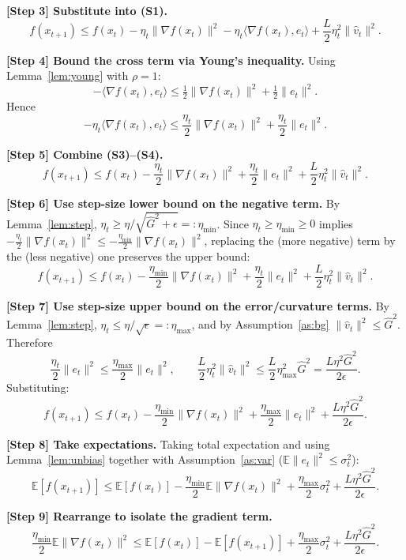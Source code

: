 \documentclass[11pt]{article}
\begin{document}
\noindent\textbf{[Step 3] Substitute into (S1).}
\[
f(x_{t+1}) \le f(x_t) - \eta_t \|\nabla f(x_t)\|^2
- \eta_t \langle \nabla f(x_t), e_t\rangle
+ \frac{L}{2}\eta_t^2 \|\hat v_t\|^2.
\tag{S3}
\]

\noindent\textbf{[Step 4] Bound the cross term via Young's inequality.}
Using Lemma~\ref{lem:young} with $\rho=1$:
\[
-\langle \nabla f(x_t), e_t\rangle
\le \tfrac12 \|\nabla f(x_t)\|^2 + \tfrac12 \|e_t\|^2.
\tag{S4}
\]
Hence
\[
-\eta_t\langle \nabla f(x_t), e_t\rangle
\le \frac{\eta_t}{2}\|\nabla f(x_t)\|^2 + \frac{\eta_t}{2}\|e_t\|^2.
\]

\noindent\textbf{[Step 5] Combine (S3)–(S4).}
\[
f(x_{t+1}) \le f(x_t) - \frac{\eta_t}{2}\|\nabla f(x_t)\|^2
+ \frac{\eta_t}{2}\|e_t\|^2
+ \frac{L}{2}\eta_t^2 \|\hat v_t\|^2.
\tag{S5}
\]

\noindent\textbf{[Step 6] Use step-size lower bound on the negative term.}
By Lemma~\ref{lem:step}, $\eta_t \ge \eta/\sqrt{\hat G^2+\epsilon} =: \eta_{\min}$.
Since $\eta_t \ge \eta_{\min} \ge 0$ implies
$-\tfrac{\eta_t}{2}\|\nabla f(x_t)\|^2 \le -\tfrac{\eta_{\min}}{2}\|\nabla f(x_t)\|^2$,
replacing the (more negative) term by the (less negative) one preserves the upper bound:
\[
f(x_{t+1}) \le f(x_t) - \frac{\eta_{\min}}{2}\|\nabla f(x_t)\|^2
+ \frac{\eta_t}{2}\|e_t\|^2
+ \frac{L}{2}\eta_t^2 \|\hat v_t\|^2.
\tag{S6}
\]

\noindent\textbf{[Step 7] Use step-size upper bound on the error/curvature terms.}
By Lemma~\ref{lem:step}, $\eta_t \le \eta/\sqrt{\epsilon} =: \eta_{\max}$,
and by Assumption~\ref{as:bg} $\|\hat v_t\|^2 \le \hat G^2$. Therefore
\[
\frac{\eta_t}{2}\|e_t\|^2 \le \frac{\eta_{\max}}{2}\|e_t\|^2,
\qquad
\frac{L}{2}\eta_t^2 \|\hat v_t\|^2 \le \frac{L}{2}\eta_{\max}^2 \hat G^2
= \frac{L\eta^2 \hat G^2}{2\epsilon}.
\tag{S7}
\]
Substituting:
\[
f(x_{t+1}) \le f(x_t) - \frac{\eta_{\min}}{2}\|\nabla f(x_t)\|^2
+ \frac{\eta_{\max}}{2}\|e_t\|^2
+ \frac{L\eta^2 \hat G^2}{2\epsilon}.
\tag{S7'}
\]

\noindent\textbf{[Step 8] Take expectations.}
Taking total expectation and using Lemma~\ref{lem:unbias} together with
Assumption~\ref{as:var} ($\mathbb{E}\|e_t\|^2 \le \sigma_t^2$):
\[
\mathbb{E}[f(x_{t+1})] \le \mathbb{E}[f(x_t)]
- \frac{\eta_{\min}}{2}\mathbb{E}\|\nabla f(x_t)\|^2
+ \frac{\eta_{\max}}{2}\sigma_t^2
+ \frac{L\eta^2 \hat G^2}{2\epsilon}.
\tag{S8}
\]

\noindent\textbf{[Step 9] Rearrange to isolate the gradient term.}
\[
\frac{\eta_{\min}}{2}\mathbb{E}\|\nabla f(x_t)\|^2
\le \mathbb{E}[f(x_t)] - \mathbb{E}[f(x_{t+1})]
+ \frac{\eta_{\max}}{2}\sigma_t^2
+ \frac{L\eta^2 \hat G^2}{2\epsilon}.
\tag{S9}
\]
\end{document}
